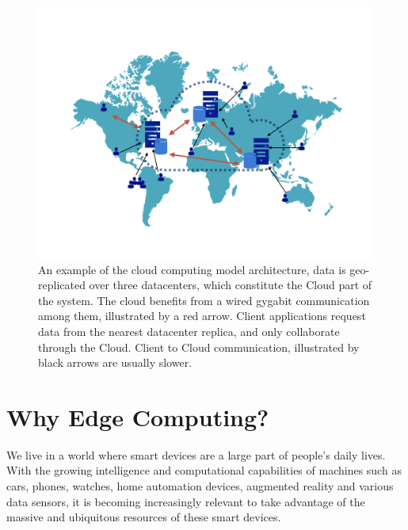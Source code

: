 \begin{figure}[tp]
    \centering
    \includegraphics[scale=0.42]{figures/cloud-architecture.png}
    \caption{An example of the cloud computing model architecture, data is geo-replicated over three datacenters, which constitute the Cloud part of the system. The cloud benefits from a wired gygabit communication among them, illustrated by a red arrow. Client applications request data from the nearest datacenter replica, and only collaborate through the Cloud. Client to Cloud communication, illustrated by black arrows are usually slower.}
    \label{fig:cloud-architecture}
\end{figure}

\section{Why Edge Computing?}
\label{ch:emergence-of-edge-computing}

We live in a world where smart devices are a large part of people's daily lives.
With the growing intelligence and computational capabilities of machines such 
as cars, phones, watches, home automation devices, augmented reality and 
various data sensors, 
it is becoming increasingly relevant to take advantage of the massive and 
ubiquitous resources of these smart devices.

